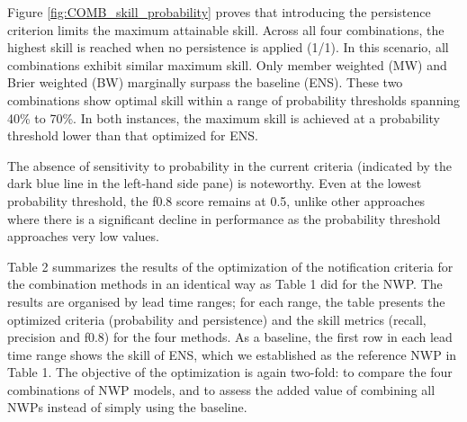\documentclass[preprint,12pt,authoryear]{elsarticle}
\begin{document}
Figure \ref{fig:COMB_skill_probability} proves that introducing the persistence criterion limits the maximum attainable skill. Across all four combinations, the highest skill is reached when no persistence is applied (1/1). In this scenario, all combinations exhibit similar maximum skill. Only member weighted (MW) and Brier weighted  (BW) marginally surpass the baseline (ENS). These two combinations show optimal skill within a range of probability thresholds spanning 40\% to 70\%. In both instances, the maximum skill is achieved at a probability threshold lower than that optimized for ENS.

The absence of sensitivity to probability in the current criteria (indicated by the dark blue line in the left-hand side pane) is noteworthy. Even at the lowest probability threshold, the f0.8 score remains at 0.5, unlike other approaches where there is a significant decline in performance as the probability threshold approaches very low values.

Table 2 summarizes the results of the optimization of the notification criteria for the combination methods in an identical way as Table 1 did for the NWP. The results are organised by lead time ranges; for each range, the table presents the optimized criteria (probability and persistence) and the skill metrics (recall, precision and f0.8) for the four methods. As a baseline, the first row in each lead time range shows the skill of ENS, which we established as the reference NWP in Table 1. The objective of the optimization is again two-fold: to compare the four combinations of NWP models, and to assess the added value of combining all NWPs instead of simply using the baseline. 
\end{document}
